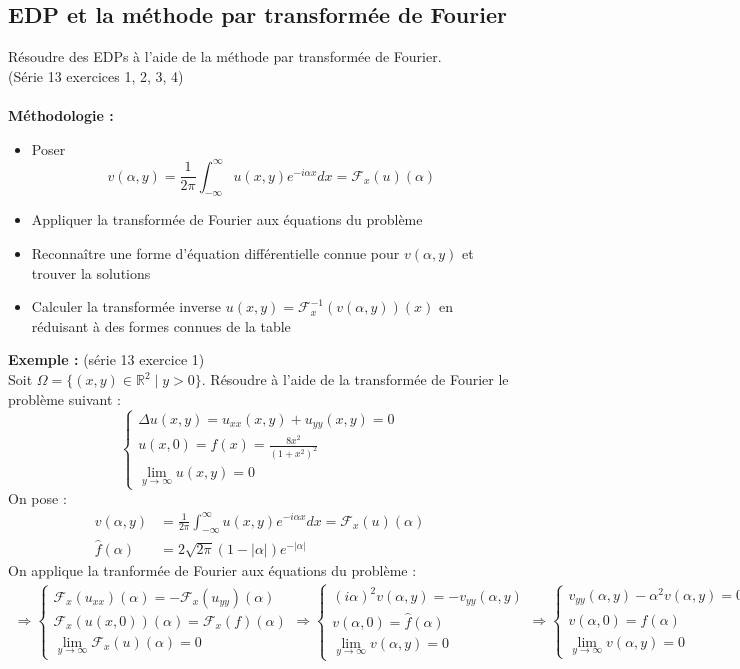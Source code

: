 \subsection{EDP et la méthode par transformée de Fourier}
Résoudre des EDPs à l’aide de la méthode par transformée de Fourier. \\
(Série 13 exercices 1, 2, 3, 4) \\
\\
\textbf{Méthodologie :}
\begin{itemize}
    \item Poser $$v(\alpha,y) = \frac{1}{2\pi} \int_{-\infty}^{\infty} u(x,y) e^{-i\alpha x}dx = \mathcal{F}_x(u)(\alpha)$$
    \item Appliquer la transformée de Fourier aux équations du problème
    \item Reconnaître une forme d'équation différentielle connue pour $v(\alpha,y)$ et trouver la solutions
    \item Calculer la transformée inverse $u(x,y) = \mathcal{F}_x^{-1}(v(\alpha,y))(x)$ en réduisant à des formes connues de la table
\end{itemize}
\textbf{Exemple :} (série 13 exercice 1) \\
Soit $\Omega = \{(x,y) \in \mathbb{R}^2 \mid y > 0\}$. Résoudre à l'aide de la transformée de Fourier le problème suivant :
$$
\begin{cases}
    \Delta u(x,y) = u_{xx}(x,y) + u_{yy}(x,y) = 0 \\
    u(x,0) = f(x) = \frac{8x^2}{(1+x^2)^2} \\
    \lim_{y \to \infty} u(x,y) = 0
\end{cases}
$$
On pose :
\begin{align*}
    v(\alpha,y) &= \frac{1}{2\pi} \int_{-\infty}^{\infty} u(x,y) e^{-i\alpha x}dx = \mathcal{F}_x(u)(\alpha) \\
    \widehat{f}(\alpha) &= 2\sqrt{2\pi} (1-|\alpha|) e^{-|\alpha|}
\end{align*}
On applique la tranformée de Fourier aux équations du problème :
\begin{align*}
    \Rightarrow
    \begin{cases}
        \mathcal{F}_x(u_{xx})(\alpha) = -\mathcal{F}_x(u_{yy})(\alpha) \\
        \mathcal{F}_x(u(x,0))(\alpha) = \mathcal{F}_x(f)(\alpha) \\
        \lim_{y \to \infty} \mathcal{F}_x(u)(\alpha) = 0
    \end{cases}
    \Rightarrow
    \begin{cases}
        (i\alpha)^2 v(\alpha,y) = -v_{yy}(\alpha,y) \\
        v(\alpha,0) = \widehat{f}(\alpha) \\
        \lim_{y \to \infty} v(\alpha,y) = 0
    \end{cases}
    \Rightarrow
    \begin{cases}
        v_{yy}(\alpha,y) - \alpha^2 v(\alpha,y) = 0 \tag{3} \\
        v(\alpha,0) = \widehat{f}(\alpha) \\
        \lim_{y \to \infty} v(\alpha,y) = 0
    \end{cases}
\end{align*}
